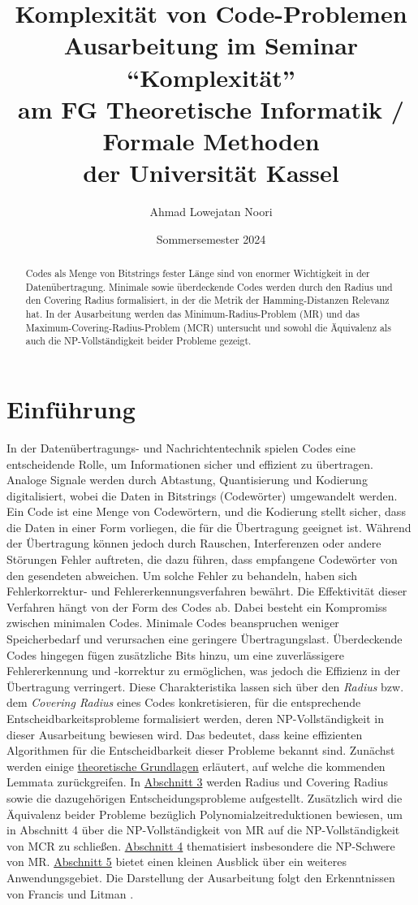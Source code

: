 \documentclass[11pt]{article}
\title{Komplexität von Code-Problemen \\[3mm] \large Ausarbeitung im Seminar ``Komplexität'' \\ am FG Theoretische Informatik / Formale Methoden \\ der Universit\"at Kassel}
\author{Ahmad Lowejatan Noori}
\date{Sommersemester 2024}
\theoremstyle{break}
\theoremstyle{norm}
\begin{document}
\usetikzlibrary{positioning}
\maketitle
\begin{abstract}
    Codes als Menge von Bit\-strings fester Länge sind von enormer Wichtigkeit in der Datenübertragung. Minimale sowie überdeckende Codes werden durch den Radius und den Covering Radius formalisiert, in der die Metrik der Hamming-Distanzen Relevanz hat. In der Ausarbeitung werden das Minimum-Radius-Problem (MR) und das Maximum-Covering-Radius-Problem (MCR) untersucht und sowohl die Äquivalenz als auch die NP-Vollständigkeit beider Probleme gezeigt. 
\end{abstract}
\section{Einführung}
\noindent
In der Datenübertragungs- und Nachrichtentechnik spielen Codes eine entscheidende Rolle, um Informationen sicher und effizient zu übertragen. Analoge Signale werden durch Abtastung, Quantisierung und Kodierung digitalisiert, wobei die Daten in Bitstrings (Codewörter) umgewandelt werden. Ein Code ist eine Menge von Codewörtern, und die Kodierung stellt sicher, dass die Daten in einer Form vorliegen, die für die Übertragung geeignet ist. Während der Übertragung können jedoch durch Rauschen, Interferenzen oder andere Störungen Fehler auftreten, die dazu führen, dass empfangene Codewörter von den gesendeten abweichen. Um solche Fehler zu behandeln, haben sich Feh\-ler\-kor\-rekt\-ur- und Fehlererkennungsverfahren bewährt. Die Effektivität dieser Verfahren hängt von der Form des Codes ab. Dabei besteht ein Kompromiss zwischen minimalen Codes. Minimale Codes beanspruchen weniger Speicherbedarf und verursachen eine geringere Übertragungslast. Überdeckende Codes hingegen fügen zusätzliche Bits hinzu, um eine zuverlässigere Fehlererkennung und -korrektur zu ermöglichen, was jedoch die Effizienz in der Übertragung verringert.
Diese Charakteristika lassen sich über den \textit{Radius} bzw. dem \textit{Covering Radius} eines Codes konkretisieren, für die entsprechende Entscheidbarkeitsprobleme formalisiert werden, deren NP-Vollständigkeit in dieser Aus\-ar\-beit\-ung bewiesen wird. Das bedeutet, dass keine effizienten Algorithmen für die Entscheidbarkeit dieser Probleme bekannt sind.
Zunächst werden einige \hyperref[absch2]{theoretische Grundlagen} erläutert, auf welche die kommenden Lemmata zurückgreifen. In \hyperref[absch3]{Abschnitt 3} werden Radius und Covering Radius sowie die dazugehörigen Entscheidungsprobleme aufgestellt. Zusätzlich wird die Äquivalenz beider Probleme bezüglich Polynomialzeit\-reduktionen bewiesen, um in Abschnitt 4 über die NP-Vollständigkeit von MR auf die NP-Vollständigkeit von MCR zu schließen. \hyperref[absch4]{Abschnitt 4} thematisiert insbesondere die NP-Schwere von MR. \hyperref[absch5]{Abschnitt 5} bietet einen kleinen Ausblick über ein weiteres Anwendungsgebiet.
Die Darstellung der Ausarbeitung folgt den Erkenntnissen von Francis und Litman \cite{Frances1997OnCP}.
\end{document}

